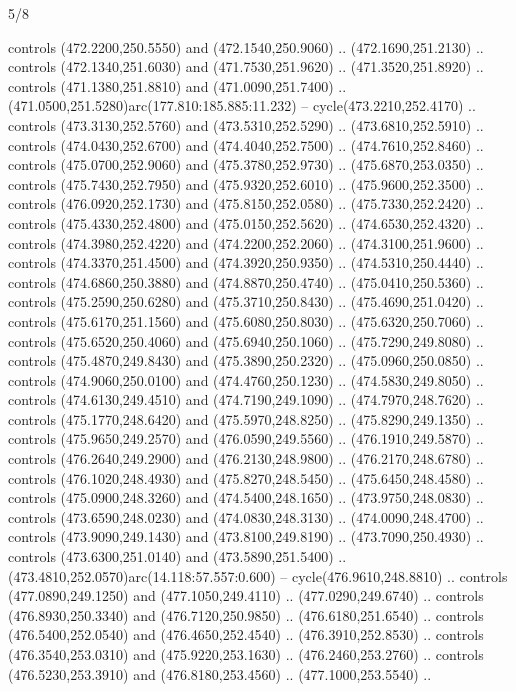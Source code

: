 \begin{flagdescription}{5/8}
\begin{scope}[xshift=0.5\flaglength,yshift=0.5\flagwidth,scale=\flagwidth/475.63]
\begin{scope}[y=0.8pt, x=0.8pt, yscale=-1, xscale=1,shift={(-450,-300)}]
\begin{scope}[cm={{1.0,0.0,0.0,1.0,(-0.0002,0.12556)}},cm={{1.0,0.0,0.0,1.0,(0.00179,0.0)}}]
\begin{scope}[cm={{1.00926,0.0,0.0,1.00926,(-3.1541,-2.47648)}}]
  controls (472.2200,250.5550) and (472.1540,250.9060) .. (472.1690,251.2130) ..
  controls (472.1340,251.6030) and (471.7530,251.9620) .. (471.3520,251.8920) ..
  controls (471.1380,251.8810) and (471.0090,251.7400) ..
  (471.0500,251.5280)arc(177.810:185.885:11.232) -- cycle(473.2210,252.4170) ..
  controls (473.3130,252.5760) and (473.5310,252.5290) .. (473.6810,252.5910) ..
  controls (474.0430,252.6700) and (474.4040,252.7500) .. (474.7610,252.8460) ..
  controls (475.0700,252.9060) and (475.3780,252.9730) .. (475.6870,253.0350) ..
  controls (475.7430,252.7950) and (475.9320,252.6010) .. (475.9600,252.3500) ..
  controls (476.0920,252.1730) and (475.8150,252.0580) .. (475.7330,252.2420) ..
  controls (475.4330,252.4800) and (475.0150,252.5620) .. (474.6530,252.4320) ..
  controls (474.3980,252.4220) and (474.2200,252.2060) .. (474.3100,251.9600) ..
  controls (474.3370,251.4500) and (474.3920,250.9350) .. (474.5310,250.4440) ..
  controls (474.6860,250.3880) and (474.8870,250.4740) .. (475.0410,250.5360) ..
  controls (475.2590,250.6280) and (475.3710,250.8430) .. (475.4690,251.0420) ..
  controls (475.6170,251.1560) and (475.6080,250.8030) .. (475.6320,250.7060) ..
  controls (475.6520,250.4060) and (475.6940,250.1060) .. (475.7290,249.8080) ..
  controls (475.4870,249.8430) and (475.3890,250.2320) .. (475.0960,250.0850) ..
  controls (474.9060,250.0100) and (474.4760,250.1230) .. (474.5830,249.8050) ..
  controls (474.6130,249.4510) and (474.7190,249.1090) .. (474.7970,248.7620) ..
  controls (475.1770,248.6420) and (475.5970,248.8250) .. (475.8290,249.1350) ..
  controls (475.9650,249.2570) and (476.0590,249.5560) .. (476.1910,249.5870) ..
  controls (476.2640,249.2900) and (476.2130,248.9800) .. (476.2170,248.6780) ..
  controls (476.1020,248.4930) and (475.8270,248.5450) .. (475.6450,248.4580) ..
  controls (475.0900,248.3260) and (474.5400,248.1650) .. (473.9750,248.0830) ..
  controls (473.6590,248.0230) and (474.0830,248.3130) .. (474.0090,248.4700) ..
  controls (473.9090,249.1430) and (473.8100,249.8190) .. (473.7090,250.4930) ..
  controls (473.6300,251.0140) and (473.5890,251.5400) ..
  (473.4810,252.0570)arc(14.118:57.557:0.600) -- cycle(476.9610,248.8810) ..
  controls (477.0890,249.1250) and (477.1050,249.4110) .. (477.0290,249.6740) ..
  controls (476.8930,250.3340) and (476.7120,250.9850) .. (476.6180,251.6540) ..
  controls (476.5400,252.0540) and (476.4650,252.4540) .. (476.3910,252.8530) ..
  controls (476.3540,253.0310) and (475.9220,253.1630) .. (476.2460,253.2760) ..
  controls (476.5230,253.3910) and (476.8180,253.4560) .. (477.1000,253.5540) ..

\end{scope}
\end{scope}
\end{scope}
\end{scope}
\end{flagdescription}
